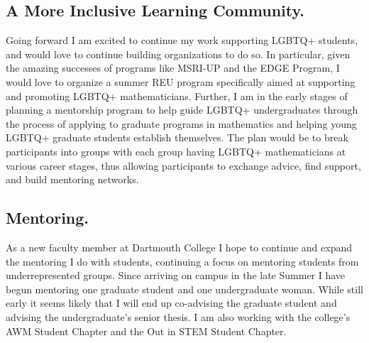 \documentclass[11pt,reqno]{amsart}
\theoremstyle{remark}
\begin{document}
\subsection{A More Inclusive Learning Community.}  Going forward I am excited to continue my work supporting LGBTQ+ students, and would love to continue building organizations to do so. In particular, given the amazing successes of programs like MSRI-UP and the EDGE Program, I would love to organize a summer REU program specifically aimed at supporting and promoting LGBTQ+ mathematicians. Further, I am in the early stages of planning a mentorship program to help guide LGBTQ+ undergraduates through the process of applying to graduate programs in mathematics and helping young LGBTQ+ graduate students establish themselves. The plan would be to break participants into groups with each group having LGBTQ+ mathematicians at various career stages, thus allowing participants to exchange advice, find support, and build mentoring networks.

\subsection{Mentoring.} As a new faculty member at Dartmouth College I hope to continue and expand the mentoring I do with students, continuing a focus on mentoring students from underrepresented groups. Since arriving on campus in the late Summer I have begun mentoring one graduate student and one undergraduate woman. While still early it seems likely that I will end up co-advising the graduate student and advising the undergraduate's senior thesis. I am also working with the college's AWM Student Chapter and the Out in STEM Student Chapter. 


\newpage
\renewcommand{\bibliofont}{\normalsize}



\end{document}
